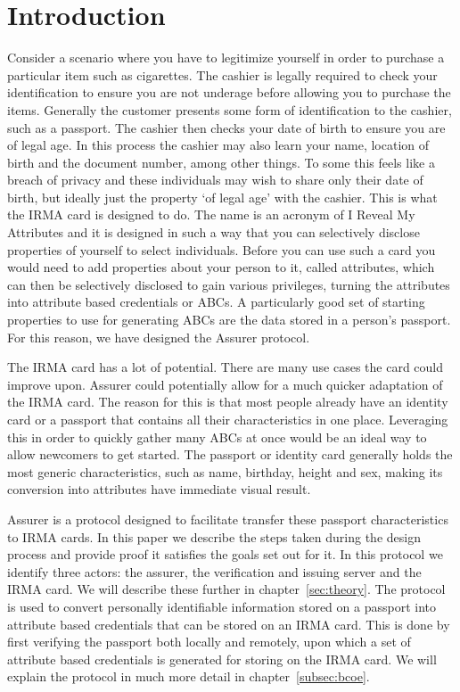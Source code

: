 \chapter{Introduction}
Consider a scenario where you have to legitimize yourself in order to purchase a particular item such as cigarettes. The cashier is legally required to check your identification to ensure you are not underage before allowing you to purchase the items. Generally the customer presents some form of identification to the cashier, such as a passport. The cashier then checks your date of birth to ensure you are of legal age. In this process the cashier may also learn your name, location of birth and the document number, among other things. To some this feels like a breach of privacy and these individuals may wish to share only their date of birth, but ideally just the property `of legal age' with the cashier. This is what the IRMA card is designed to do. The name is an acronym of I Reveal My Attributes and it is designed in such a way that you can selectively disclose properties of yourself to select individuals. Before you can use such a card you would need to add properties about your person to it, called attributes, which can then be selectively disclosed to gain various privileges, turning the attributes into attribute based credentials or ABCs. A particularly good set of starting properties to use for generating ABCs are the data stored in a person's passport. For this reason, we have designed the Assurer protocol.

The IRMA card has a lot of potential. There are many use cases the card could improve upon. Assurer could potentially allow for a much quicker adaptation of the IRMA card. The reason for this is that most people already have an identity card or a passport that contains all their characteristics in one place. Leveraging this in order to quickly gather many ABCs at once would be an ideal way to allow newcomers to get started. The passport or identity card generally holds the most generic characteristics, such as name, birthday, height and sex, making its conversion into attributes have immediate visual result.

Assurer is a protocol designed to facilitate transfer these passport characteristics to IRMA cards. In this paper we describe the steps taken during the design process and provide proof it satisfies the goals set out for it. In this protocol we identify three actors: the assurer, the verification and issuing server and the IRMA card. We will describe these further in chapter~\ref{sec:theory}. The protocol is used to convert personally identifiable information stored on a passport into attribute based credentials that can be stored on an IRMA card. This is done by first verifying the passport both locally and remotely, upon which a set of attribute based credentials is generated for storing on the IRMA card. We will explain the protocol in much more detail in chapter~\ref{subsec:bcoe}.


